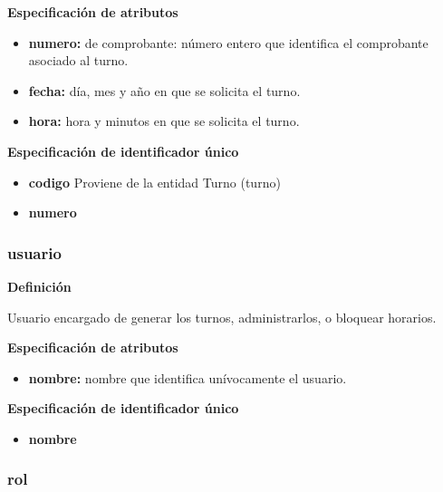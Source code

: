 \documentclass[a4paper,11pt]{article}
\begin{document}
\textbf{Especificación de atributos}

\begin{itemize}

     \item \textbf{numero:} de comprobante: número entero que identifica el comprobante asociado 
     al turno.

     \item \textbf{fecha:} día, mes y año en que se solicita el turno.

     \item \textbf{hora:} hora y minutos en que se solicita el turno.

\end{itemize}

\textbf{Especificación de identificador único}

\begin{itemize}

     \item \textbf{codigo} Proviene de la entidad Turno (turno)

     \item \textbf{numero}

\end{itemize}

\subsubsection{\textbf{usuario}}

\textbf{Definición}

Usuario encargado de generar los turnos, administrarlos, o bloquear horarios.

\textbf{Especificación de atributos}

\begin{itemize}

     \item \textbf{nombre:} nombre que identifica unívocamente el usuario. 

\end{itemize}

\textbf{Especificación de identificador único}

\begin{itemize}

     \item \textbf{nombre}

\end{itemize}

\subsubsection{\textbf{rol}}
\end{document}
